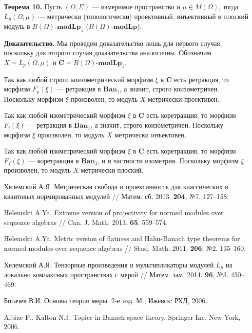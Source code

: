 \documentclass[11pt,twoside]{article}
\begin{document}
        \textbf{Теорема 10.}
        Пусть $(\Omega,\Sigma)$ --- измеримое пространство и $\mu\in M(\Omega)$, тогда
    $L_p(\Omega,\mu)$ --- метрически (топологически)
        проективный, инъективный и плоский модуль в $B(\Omega)$-$\mathbf{modLp}_1$
        ($B(\Omega)$-$\mathbf{modLp}$).

        \textbf{Доказательство.} Мы проведем доказательство лишь для первого
        случая, поскольку для второго случая доказательства аналогичны.
        Обозначим $X=L_p(\Omega,\mu)$ и
    $\mathbf{C}=B(\Omega)$-$\mathbf{modLp}_1$.

        Так как любой строго коизометрический морфизм $\xi$ в $\mathbf{C}$ есть
        ретракция, то морфизм $F_p(\xi)$ --- ретракция в $\mathbf{Ban}_1$, а
        значит, строго коизометричен. Поскольку морфизм $\xi$ произволен, то
        модуль $X$ метрически проективен.

        Так как любой изометрический морфизм $\xi$ в $\mathbf{C}$ есть
        коретракция, то морфизм $F_i(\xi)$ --- ретракция в $\mathbf{Ban}_1$, а
        значит, строго коизометричен. Поскольку морфизм $\xi$ произволен, то
        модуль $X$ метрически инъективен.

        Так как любой изометрический морфизм $\xi$ в $\mathbf{C}$ есть
        коретракция, то морфизм $F_f(\xi)$ --- коретракция в $\mathbf{Ban}_1$, и
        в частности изометрия. Поскольку морфизм $\xi$ произволен, то модуль $X$
метрически плоский.


\newpage


\textbf{\spisoklit}
{\small{}

    {Хелемский А.Я.} Метрическая свобода и проективность для классических и
    квантовых нормированных модулей // Матем. сб. 2013. \textbf{204}, №7.
    127--158.

    {Helemskii A.Ya.} Extreme version of projectivity for normed modules over
    sequence algebras // Can. J. Math. 2013. \textbf{65}. 559--574.

    {Helemskii A.Ya.} Metric version of flatness and Hahn-Banach type theorems
    for normed modules over sequence algebras // Stud. Math. 2011. \textbf{206},
    №2. 135--160.

    {Хелемский А.Я.} Тензорные произведения и мультипликаторы модулей $L_p$ на
    локально компактных пространствах с мерой // Матем. зам. 2014. \textbf{96},
    №3. 450–469.


    {Богачев В.И.} Основы теории меры. 2-е изд. М.; Ижевск: РХД, 2006.

    {Albiac F., Kalton N.J.} Topics in Banach space theory. Springer Inc.
    New-York, 2006.


}
\lend
\end{document}
